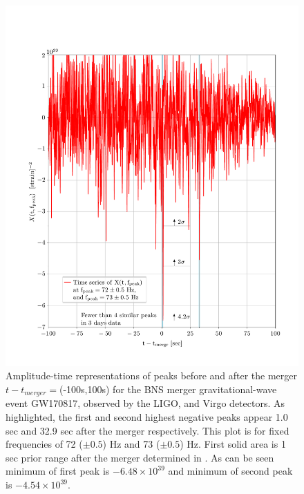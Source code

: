 \documentclass[a4paper,11pt]{article}
\begin{document}
\begin{figure}[!tbp]
    \includegraphics[width=1\textwidth]{peaks_in_time.pdf}
 \caption{Amplitude-time representations of peaks before and after the merger $t-t_{merger}=$(-100s,100s) for the BNS merger gravitational-wave event GW170817, observed by the LIGO, and Virgo detectors. As highlighted, the first and second highest negative peaks appear 1.0 sec and 32.9 sec after the merger respectively.  This plot is for fixed frequencies of 72 ($\pm0.5$) Hz and 73 ($\pm0.5$) Hz. First solid area is 1 sec prior range after the merger determined in \cite{Abbott:2017dke}. As can be seen minimum of first peak is $-6.48\times10^{39}$ and minimum of second peak is $-4.54 \times 10^{39}$.}
 \label{NS-NS_2}
\end{figure}
\end{document}
